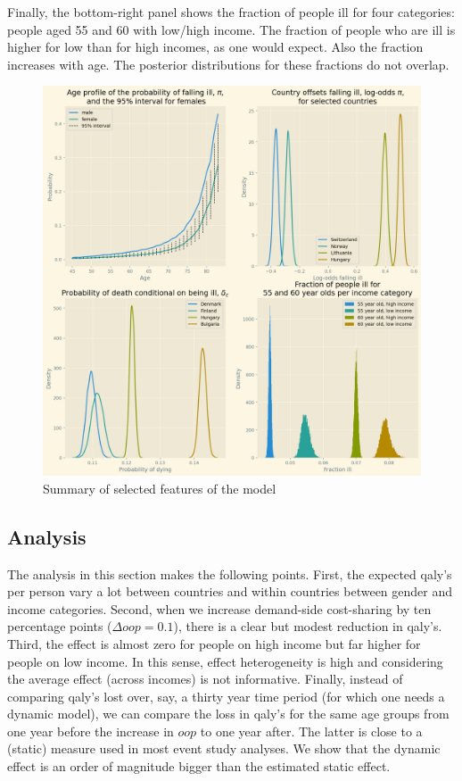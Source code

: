 \documentclass[a4paper,12pt]{article}
\begin{document}
Finally, the bottom-right panel shows the fraction of people ill for four categories: people aged 55 and 60 with low/high income. The fraction of people who are ill is higher for low than for high incomes, as one would expect. Also the fraction increases with age. The posterior distributions for these fractions do not overlap.

\begin{figure}[htbp]
\centering
\includegraphics[width=.9\linewidth]{./figures/summary_figure.png}
\caption{\label{fig:summary}Summary of selected features of the model}
\end{figure}
\subsection{Analysis}
\label{sec:org6cde57b}

The analysis in this section makes the following points. First, the expected qaly's per person vary a lot between countries and within countries between gender and income categories. Second, when we increase demand-side cost-sharing by ten percentage points (\(\Delta oop = 0.1\)), there is a clear but modest reduction in qaly's. Third, the effect is almost zero for people on high income but far higher for people on low income. In this sense, effect heterogeneity is high and considering the average effect (across incomes) is not informative. Finally, instead of comparing qaly's lost over, say, a thirty year time period (for which one needs a dynamic model), we can compare the loss in qaly's for the same age groups from one year before the increase in \(oop\) to one year after. The latter is close to a (static) measure used in most event study analyses. We show that the dynamic effect is an order of magnitude bigger than the estimated static effect.
\end{document}
